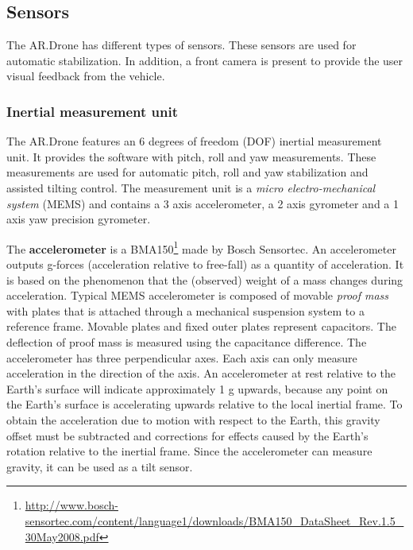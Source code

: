 \subsection{Sensors}
The AR.Drone has different types of sensors.
These sensors are used for automatic stabilization.
In addition, a front camera is present to provide the user visual feedback from the vehicle.


\subsubsection{Inertial measurement unit}
The AR.Drone features an 6 degrees of freedom (DOF) inertial measurement unit.
It provides the software with pitch, roll and yaw measurements.
These measurements are used for automatic pitch, roll and yaw stabilization and assisted tilting control.
The measurement unit is a \textit{micro electro-mechanical system} (MEMS) and contains
a 3 axis accelerometer, a 2 axis gyrometer and a 1 axis yaw precision gyrometer.

The \textbf{accelerometer} is a BMA150\footnote{\url{http://www.bosch-sensortec.com/content/language1/downloads/BMA150_DataSheet_Rev.1.5_30May2008.pdf}} made by Bosch Sensortec.
An accelerometer outputs g-forces (acceleration relative to free-fall) as a quantity of acceleration.
It is based on the phenomenon that the (observed) weight of a mass changes during acceleration.
Typical MEMS accelerometer is composed of movable \textit{proof mass} with plates that is attached through a mechanical suspension system to a reference frame.
Movable plates and fixed outer plates represent capacitors. The deflection of proof mass is measured using the capacitance difference.
The accelerometer has three perpendicular axes. Each axis can only measure acceleration in the direction of the axis.
An accelerometer at rest relative to the Earth's surface will indicate approximately 1 g upwards, because any point on the Earth's surface is accelerating upwards relative to the local inertial frame.
To obtain the acceleration due to motion with respect to the Earth, this gravity offset must be subtracted and corrections for effects caused by the Earth's rotation relative to the inertial frame.
Since the accelerometer can measure gravity, it can be used as a tilt sensor.

